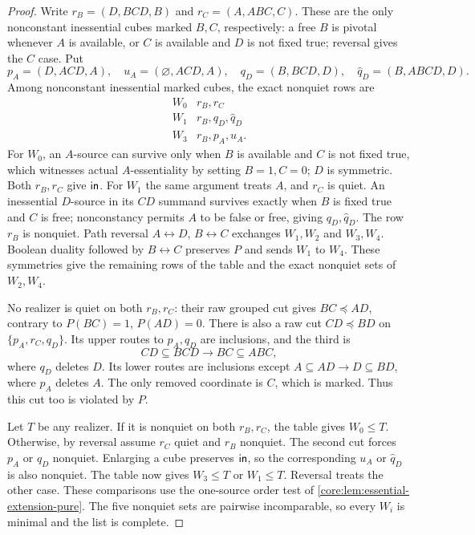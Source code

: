 \begin{proof}
Write $r_B=(D,BCD,B)$ and $r_C=(A,ABC,C)$. These are the only
nonconstant inessential cubes marked $B,C$, respectively: a free $B$
is pivotal whenever $A$ is available, or $C$ is available and $D$ is
not fixed true; reversal gives the $C$ case.
Put
\[
 p_A=(D,ACD,A),\quad u_A=(\varnothing,ACD,A),\quad
 q_D=(B,BCD,D),\quad \widehat q_D=(B,ABCD,D).
\]
Among nonconstant inessential marked cubes, the exact nonquiet rows are
\[
 \begin{array}{c|l}
 W_0&r_B,r_C\\
 W_1&r_B,q_D,\widehat q_D\\
 W_3&r_B,p_A,u_A.
 \end{array}
\]
For $W_0$, an $A$-source can survive only when $B$ is available and
$C$ is not fixed true, which witnesses actual $A$-essentiality by
setting $B=1,C=0$; $D$ is symmetric. Both $r_B,r_C$ give $\mathsf{in}$.
For $W_1$ the same argument treats $A$, and $r_C$ is quiet.
An inessential $D$-source in its $CD$ summand survives exactly when
$B$ is fixed true and $C$ is free; nonconstancy permits $A$ to be
false or free, giving $q_D,\widehat q_D$. The row $r_B$ is nonquiet.
Path reversal $A\leftrightarrow D$, $B\leftrightarrow C$ exchanges
$W_1,W_2$ and $W_3,W_4$. Boolean duality followed by
$B\leftrightarrow C$ preserves $P$ and sends $W_1$ to $W_4$.
These symmetries give the remaining rows of the table and the exact
nonquiet sets of $W_2,W_4$.

No realizer is quiet on both $r_B,r_C$: their raw grouped cut gives
$BC\preceq AD$, contrary to $P(BC)=1$, $P(AD)=0$.
There is also a raw cut $CD\preceq BD$ on $\{p_A,r_C,q_D\}$.
Its upper routes to $p_A,q_D$ are inclusions, and the third is
\[
 CD\subseteq BCD\longrightarrow BC\subseteq ABC,
\]
where $q_D$ deletes $D$. Its lower routes are inclusions except
$A\subseteq AD\longrightarrow D\subseteq BD$, where $p_A$ deletes
$A$. The only removed coordinate is $C$, which is marked. Thus this
cut too is violated by $P$.

Let $T$ be any realizer. If it is nonquiet on both $r_B,r_C$, the table
gives $W_0\leq T$. Otherwise, by reversal assume $r_C$ quiet and $r_B$
nonquiet. The second cut forces $p_A$ or $q_D$ nonquiet. Enlarging a
cube preserves $\mathsf{in}$, so the corresponding $u_A$ or $\widehat q_D$
is also nonquiet. The table now gives $W_3\leq T$ or $W_1\leq T$.
Reversal treats the other case. These comparisons use the one-source
order test of \cref{core:lem:essential-extension-pure}.
The five nonquiet sets are pairwise incomparable, so every $W_i$ is
minimal and the list is complete.


\end{proof}

